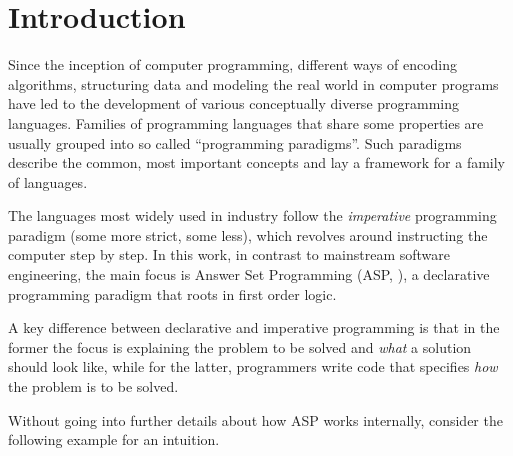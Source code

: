 \documentclass[final]{vutinfth} %
\begin{document}
\tableofcontents* %

\mainmatter

\chapter{Introduction}
\label{chap:intro}

Since the inception of computer programming, different ways of encoding algorithms, structuring data and modeling the real world in computer programs have led to the development of various conceptually diverse programming languages. Families of programming languages that share some properties are usually grouped into so called \enquote{programming paradigms}.
Such paradigms describe the common, most important concepts and lay a framework for a family of languages.

The languages most widely used in industry follow the \emph{imperative} programming paradigm (some more strict, some less), which revolves around instructing the computer step by step. In this work, in contrast to mainstream software engineering, the main focus is Answer Set Programming (ASP, \cite{stable}), a declarative programming paradigm that roots in first order logic.

A key difference between declarative and imperative programming is that in the former the focus is explaining the problem to be solved and \emph{what} a solution should look like, while for the latter, programmers write code that specifies \emph{how} the problem is to be solved.

Without going into further details about how ASP works internally, consider the following example for an intuition.
\end{document}
